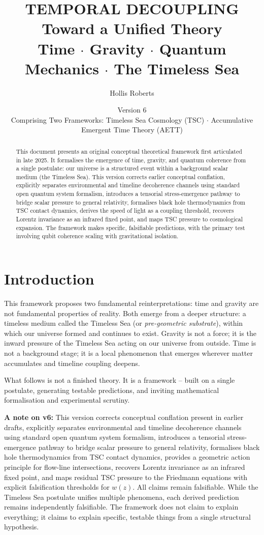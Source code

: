 \documentclass[11pt,a4paper]{article}
\title{\textbf{TEMPORAL DECOUPLING}\\Toward a Unified Theory\\Time $\cdot$ Gravity $\cdot$ Quantum Mechanics $\cdot$ The Timeless Sea}
\author{Hollis Roberts}
\date{Version 6 \textperiodcentered 2026\\Comprising Two Frameworks: Timeless Sea Cosmology (TSC) $\cdot$ Accumulative Emergent Time Theory (AETT)}
\begin{document}
\maketitle

\begin{abstract}
This document presents an original conceptual theoretical framework first articulated in late 2025. It formalises the emergence of time, gravity, and quantum coherence from a single postulate: our universe is a structured event within a background scalar medium (the Timeless Sea). This version corrects earlier conceptual conflation, explicitly separates environmental and timeline decoherence channels using standard open quantum system formalism, introduces a tensorial stress-emergence pathway to bridge scalar pressure to general relativity, formalises black hole thermodynamics from TSC contact dynamics, derives the speed of light as a coupling threshold, recovers Lorentz invariance as an infrared fixed point, and maps TSC pressure to cosmological expansion. The framework makes specific, falsifiable predictions, with the primary test involving qubit coherence scaling with gravitational isolation.
\end{abstract}

\section*{Introduction}
This framework proposes two fundamental reinterpretations: time and gravity are not fundamental properties of reality. Both emerge from a deeper structure: a timeless medium called the Timeless Sea (or \textit{pre-geometric substrate}), within which our universe formed and continues to exist. Gravity is not a force; it is the inward pressure of the Timeless Sea acting on our universe from outside. Time is not a background stage; it is a local phenomenon that emerges wherever matter accumulates and timeline coupling deepens.

What follows is not a finished theory. It is a framework -- built on a single postulate, generating testable predictions, and inviting mathematical formalisation and experimental scrutiny.

\noindent\textbf{A note on v6:} This version corrects conceptual conflation present in earlier drafts, explicitly separates environmental and timeline decoherence channels using standard open quantum system formalism, introduces a tensorial stress-emergence pathway to bridge scalar pressure to general relativity, formalises black hole thermodynamics from TSC contact dynamics, provides a geometric action principle for flow-line intersections, recovers Lorentz invariance as an infrared fixed point, and maps residual TSC pressure to the Friedmann equations with explicit falsification thresholds for $w(z)$. All claims remain falsifiable. While the Timeless Sea postulate unifies multiple phenomena, each derived prediction remains independently falsifiable. The framework does not claim to explain everything; it claims to explain specific, testable things from a single structural hypothesis.
\end{document}
